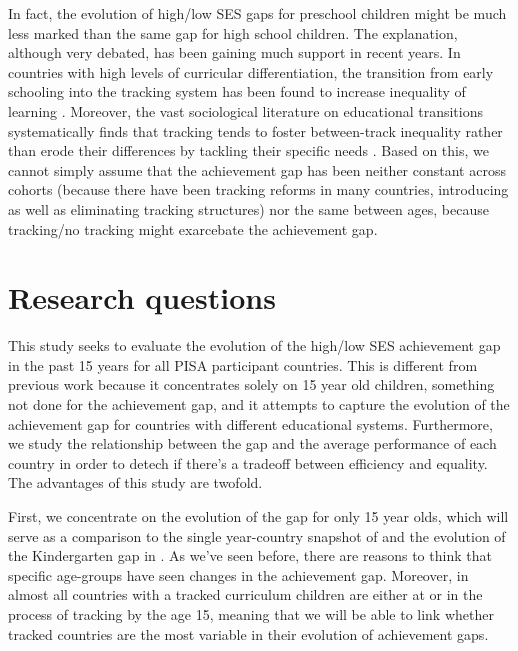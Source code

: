 \documentclass[11pt, a4paper]{article}\usepackage[]{graphicx}\usepackage[]{color}
\begin{document}
In fact, the evolution of high/low SES gaps for preschool children might be much less marked than the same gap for high school children. The explanation, although very debated, has been gaining much support in recent years. In countries with high levels of curricular differentiation, the transition from early schooling into the tracking system has been found to increase inequality of learning \citep{hanushek_woesmann_tracking}. Moreover, the vast sociological literature on educational transitions systematically finds that tracking tends to foster between-track inequality rather than erode their differences by tackling their specific needs \citep{werfhorst_mijs}. Based on this, we cannot simply assume that the achievement gap has been neither constant across cohorts (because there have been tracking reforms in many countries, introducing as well as eliminating tracking structures) nor the same between ages, because tracking/no tracking might exarcebate the achievement gap.


\section{Research questions}

This study seeks to evaluate the evolution of the high/low SES achievement gap in the past 15 years for all PISA participant countries. This is different from previous work because it concentrates solely on 15 year old children, something not done for the achievement gap, and it attempts to capture the evolution of the achievement gap for countries with different educational systems. Furthermore, we study the relationship between the gap and the average performance of each country in order to detech if there's a tradeoff between efficiency and equality. The advantages of this study are twofold.

First, we concentrate on the evolution of the gap for only 15 year olds, which will serve as a comparison to the single year-country snapshot of \citet{anna2016} and the evolution of the Kindergarten gap in \citet{reardon_portilla}. As we've seen before, there are reasons to think that specific age-groups have seen changes in the achievement gap. Moreover, in almost all countries with a tracked curriculum children are either at or in the process of tracking by the age 15, meaning that we will be able to link whether tracked countries are the most variable in their evolution of achievement gaps.
\end{document}
